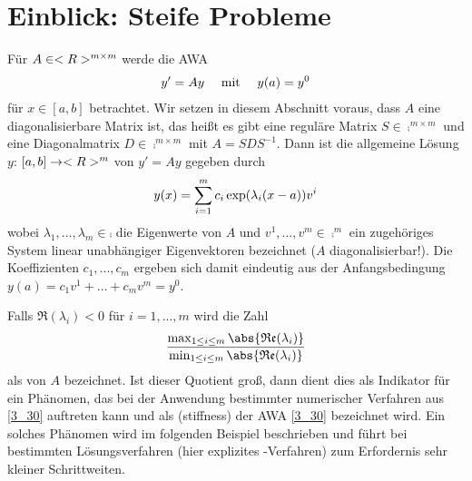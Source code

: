 \section{Einblick: Steife Probleme}

Für $A\in<R>^{m\times m}$ werde die AWA
\begin{align}
	\label{3_30}
	y' = Ay\quad\mit\quad y(a)=y^0
\end{align}
für $x\in [a,b]$ betrachtet. Wir setzen in diesem Abschnitt voraus, dass $A$ eine diagonalisierbare Matrix ist, das heißt es gibt eine reguläre Matrix $S\in\comp^{m\times m}$ und eine Diagonalmatrix $D\in\comp^{m\times m}$ mit $A=SDS^{-1}$. Dann ist die allgemeine Lösung $y$: $[a,b]\to<R>^m$ von $y'=Ay$ gegeben durch
\begin{align}
	y(x) = \sum_{i=1}^m c_i\exp(\lambda_i (x-a))v^i \notag
\end{align}
wobei $\lambda_1,...,\lambda_m\in\comp$ die Eigenwerte von $A$ und $v^1,...,v^m\in\comp^m$ ein zugehöriges System linear unabhängiger Eigenvektoren bezeichnet ($A$ diagonalisierbar!). Die Koeffizienten $c_1,...,c_m$ ergeben sich damit eindeutig aus der Anfangsbedingung $y(a)=c_1v^1+\dots+c_mv^m=y^0$.

Falls $\Re(\lambda_i)<0$ für $i=1,...,m$ wird die Zahl
\begin{align}
	\frac{\max_{1\le i\le m}\abs{\Re(\lambda_i)}}{\min_{1\le i\le m}\abs{\Re(\lambda_i)}}\notag
\end{align}
als  von $A$ bezeichnet. Ist dieser Quotient groß, dann dient dies als Indikator für ein Phänomen, das bei der Anwendung bestimmter numerischer Verfahren aus \cref{3_30} auftreten kann und als  (stiffness) der AWA \cref{3_30} bezeichnet wird. Ein solches Phänomen wird im folgenden Beispiel beschrieben und führt bei bestimmten Lösungsverfahren (hier explizites -Verfahren) zum Erfordernis sehr kleiner Schrittweiten.

